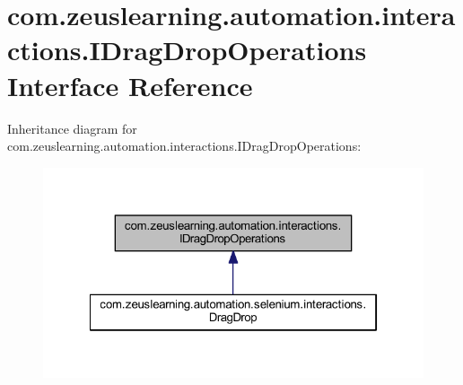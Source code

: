 \hypertarget{interfacecom_1_1zeuslearning_1_1automation_1_1interactions_1_1IDragDropOperations}{}\section{com.\+zeuslearning.\+automation.\+interactions.\+I\+Drag\+Drop\+Operations Interface Reference}
\label{interfacecom_1_1zeuslearning_1_1automation_1_1interactions_1_1IDragDropOperations}


Inheritance diagram for com.\+zeuslearning.\+automation.\+interactions.\+I\+Drag\+Drop\+Operations\+:\nopagebreak
\begin{figure}[H]
\begin{center}
\leavevmode
\includegraphics[width=322pt]{d3/d4d/interfacecom_1_1zeuslearning_1_1automation_1_1interactions_1_1IDragDropOperations__inherit__graph}
\end{center}
\end{figure}
